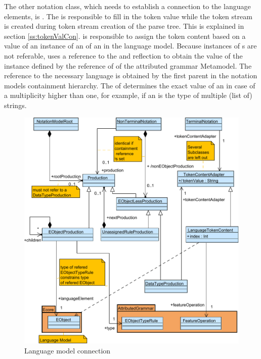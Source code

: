 The other notation class, which needs to establish a connection to the language elements, is . The  is responsible to fill in the token value while the token stream is created during token stream creation of the parse tree. This is explained in section \ref{ss:tokenValCon}.  is responsible to assign the token content based on a value of an instance of an  of an  in the language model. Because instances of s are not referable,  uses a reference to the  and reflection to obtain the value of the  instance defined by the  reference of  of the attributed grammar Metamodel. The reference to the necessary language  is obtained by the first parent  in the notation models containment hierarchy. The  of  determines the exact value of an  in case of a multiplicity higher than one, for example, if an  is the type of multiple (list of) strings. 

\begin{figure}
\centering
\includegraphics[scale=0.8]{gfx/ex/Notation_LangRel} 
\caption{Language model connection}
\label{MM:Not:LR}
\end{figure}

